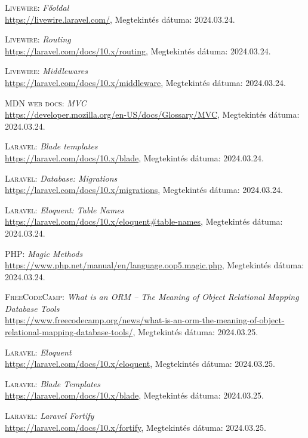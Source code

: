 \documentclass[
]{thesis-ekf}
\theoremstyle{definition}
\theoremstyle{remark}
\begin{document}
\begin{thebibliography}{47}
\textsc{Livewire}: \emph{Főoldal}
\\
\url{https://livewire.laravel.com/}, Megtekintés dátuma: 2024.03.24.

\textsc{Livewire}: \emph{Routing}
\\
\url{https://laravel.com/docs/10.x/routing}, Megtekintés dátuma: 2024.03.24.

\textsc{Livewire}: \emph{Middlewares}
\\
\url{https://laravel.com/docs/10.x/middleware}, Megtekintés dátuma: 2024.03.24.

\textsc{MDN web docs}: \emph{MVC}
\\
\url{https://developer.mozilla.org/en-US/docs/Glossary/MVC}, Megtekintés dátuma: 2024.03.24.

\textsc{Laravel}: \emph{Blade templates}
\\
\url{https://laravel.com/docs/10.x/blade}, Megtekintés dátuma: 2024.03.24.

\textsc{Laravel}: \emph{Database: Migrations}
\\
\url{https://laravel.com/docs/10.x/migrations}, Megtekintés dátuma: 2024.03.24.

\textsc{Laravel}: \emph{Eloquent: Table Names}
\\
\url{https://laravel.com/docs/10.x/eloquent#table-names}, Megtekintés dátuma: 2024.03.24.

\textsc{PHP}: \emph{Magic Methods}
\\
\url{https://www.php.net/manual/en/language.oop5.magic.php}, Megtekintés dátuma: 2024.03.24.

\textsc{FreeCodeCamp}: \emph{What is an ORM – The Meaning of Object Relational Mapping Database Tools}
\\
\url{https://www.freecodecamp.org/news/what-is-an-orm-the-meaning-of-object-relational-mapping-database-tools/}, Megtekintés dátuma: 2024.03.25.

\textsc{Laravel}: \emph{Eloquent}
\\
\url{https://laravel.com/docs/10.x/eloquent}, Megtekintés dátuma: 2024.03.25.

\textsc{Laravel}: \emph{Blade Templates}
\\
\url{https://laravel.com/docs/10.x/blade}, Megtekintés dátuma: 2024.03.25.

\textsc{Laravel}: \emph{Laravel Fortify}
\\
\url{https://laravel.com/docs/10.x/fortify}, Megtekintés dátuma: 2024.03.25.


\end{thebibliography}
\end{document}
